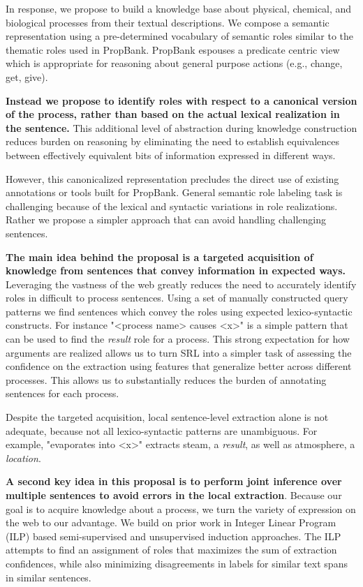 In response, we propose to build a knowledge base about physical, chemical, and biological processes from their textual descriptions. 
We compose a semantic representation using a pre-determined vocabulary of semantic roles similar to the thematic roles used in PropBank.
PropBank espouses a predicate centric view which is appropriate for reasoning about general purpose actions (e.g., change, get, give).

{\bf Instead we propose to identify roles with respect to a canonical version of the process, rather than based on the actual lexical realization in the sentence.}
This additional level of abstraction during knowledge construction reduces burden on reasoning by eliminating the need to establish equivalences 
between effectively equivalent bits of information expressed in different ways.

However, this canonicalized representation precludes the direct use of existing annotations or tools built for PropBank.
General semantic role labeling task is challenging because of the lexical and syntactic variations in role realizations. 
Rather we propose a simpler approach that can avoid handling challenging sentences.

{\bf The main idea behind the proposal is a targeted acquisition of knowledge from sentences that convey information in expected ways.}
Leveraging the vastness of the web greatly reduces the need to accurately identify roles in difficult to process sentences.
Using a set of manually constructed query patterns we find sentences which convey the roles using expected lexico-syntactic constructs. 
For instance "<process name> causes <x>" is a simple pattern that can be used to find the {\em result} role for a process. 
This strong expectation for how arguments are realized allows us to turn SRL into a simpler task of assessing the confidence on the extraction using features that generalize better across different processes.  
This allows us to substantially reduces the burden of annotating sentences for each process.

Despite the targeted acquisition, local sentence-level extraction alone is not adequate, because not all lexico-syntactic patterns are unambiguous. 
For example, "evaporates into <x>" extracts steam, a {\em result}, as well as atmosphere, a {\em location}. 

{\bf A second key idea in this proposal is to perform joint inference over multiple sentences to avoid errors in the local extraction}.
Because our goal is to acquire knowledge about a process, we turn the variety of expression on the web to our advantage. 
We build on prior work in Integer Linear Program (ILP) based semi-supervised and unsupervised induction approaches. 
The ILP attempts to find an assignment of roles that maximizes the sum of extraction confidences, 
while also minimizing disagreements in labels for similar text spans in similar sentences.

